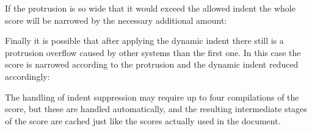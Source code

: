 \documentclass{scrartcl}
\begin{document}

If the protrusion is so wide that it would exceed the allowed indent the whole
score will be narrowed by the necessary additional amount:


Finally it is possible that after applying the dynamic indent there still is a
protrusion overflow caused by other systems than the first one.  In this case
the score is narrowed according to the protrusion and the dynamic indent reduced
accordingly:




The handling of indent suppression may require up to four compilations of the
score, but these are handled automatically, and the resulting intermediate
stages of the score are cached just like the scores actually used in the
document.
\end{document}
